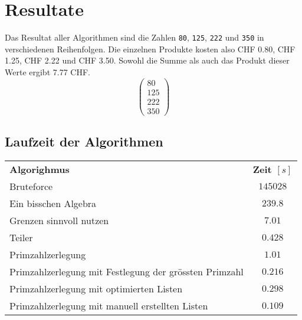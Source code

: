 \documentclass[10pt, fleqn]{article}
\begin{document}
\section{Resultate}
Das Resultat aller Algorithmen sind die Zahlen \verb!80!, \verb!125!, 
\verb!222! und \verb!350! in verschiedenen Reihenfolgen. 
Die einzelnen Produkte kosten also CHF 0.80, CHF 1.25, CHF 2.22 und CHF 3.50. 
Sowohl die Summe als auch das Produkt dieser Werte ergibt 7.77 CHF. 
\[ \begin{pmatrix}80\\125\\222\\350\end{pmatrix} \]

\subsection{Laufzeit der Algorithmen}
\begin{tabular}{@{}lc}
\rowcolor{white}\textbf{Algorighmus}                                    
  &\textbf{Zeit $[s]$} \\
\rowcolor{lgray}Bruteforce                                              
  & $145028$ \\
\rowcolor{white}Ein bisschen Algebra                                    
  & $239.8$ \\
\rowcolor{lgray}Grenzen sinnvoll nutzen                                 
  & $7.01$ \\
\rowcolor{white}Teiler                                                  
  & $0.428$ \\
\rowcolor{lgray}Primzahlzerlegung                                       
  & $1.01$ \\
\rowcolor{white}Primzahlzerlegung mit Festlegung der grössten Primzahl  
  & $0.216$ \\
\rowcolor{lgray}Primzahlzerlegung mit optimierten Listen                
  & $0.298$ \\
\rowcolor{white}Primzahlzerlegung mit manuell erstellten Listen         
  & $0.109$ \\

\end{tabular}

\clearpage
\end{document}
